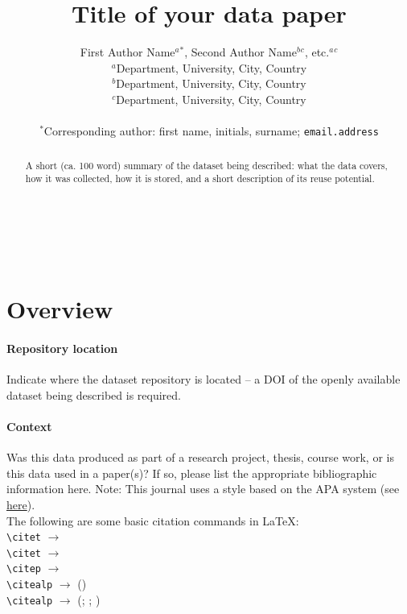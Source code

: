 \documentclass{article}
\title{Title of your data paper}
\author{First Author Name$^{a}$$^{*}$, Second Author Name$^{b}$$^{c}$, etc.$^{a}$$^{c}$ \\
        \small $^{a}$Department, University, City, Country \\
        \small $^{b}$Department, University, City, Country \\
        \small $^{c}$Department, University, City, Country \\\\
        \small $^{*}$Corresponding author: first name, initials, surname; \tt{email.address} \\
}
\date{}
\begin{document}
\maketitle
\begin{abstract} 
\noindent A short (ca. 100 word) summary of the dataset being described: what the data covers, how it was collected, how it is stored, and a short description of its reuse potential. \end{abstract}

\noindent{}\\

\noindent{}\\


\section{Overview}
\paragraph{Repository location} Indicate where the dataset repository is located – a DOI of the openly available dataset being described is required.
\paragraph{Context} Was this data produced as part of a research project, thesis, course work, or is this data used in a paper(s)? If so, please list the appropriate bibliographic information here. Note: This journal uses a style based on the APA system (see \href{https://openhumanitiesdata.metajnl.com/about/submissions/#References}{here}).\\

\noindent The following are some basic citation commands in \LaTeX: \\

\noindent
\verb|\citet| $\rightarrow$ \citet{jenset&mcgil}\\
\verb|\citet| $\rightarrow$ \citet{shree-a}\\
\verb|\citep| $\rightarrow$ \citep{fabricius-hansen2012b}\\
\verb|\citealp| $\rightarrow$ (\citealp{eckhoff2018a})\\
\verb|\citealp| $\rightarrow$ (\citealp{eckhoff2018a}; \citealp{fabricius-hansen2012b}; \citealp{shree-a})\\
\end{document}
